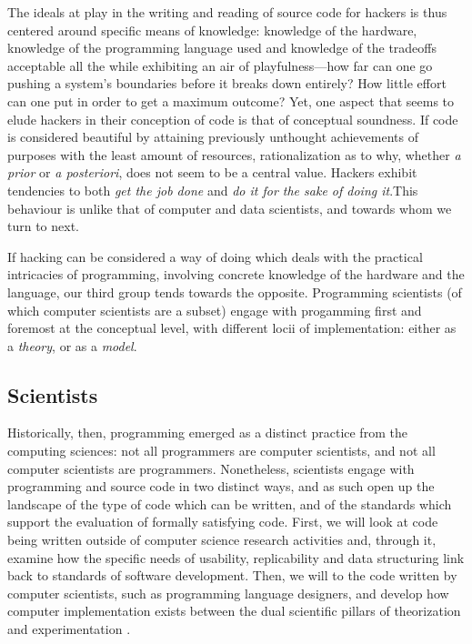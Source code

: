 The ideals at play in the writing and reading of source code for hackers is thus centered around specific means of knowledge: knowledge of the hardware, knowledge of the programming language used and knowledge of the tradeoffs acceptable all the while exhibiting an air of playfulness—how far can one go pushing a system's boundaries before it breaks down entirely? How little effort can one put in order to get a maximum outcome? Yet, one aspect that seems to elude hackers in their conception of code is that of conceptual soundness. If code is considered beautiful by attaining previously unthought achievements of purposes with the least amount of resources, rationalization as to why, whether \emph{a prior} or \emph{a posteriori}, does not seem to be a central value. Hackers exhibit tendencies to both \emph{get the job done} and \emph{do it for the sake of doing it}.This behaviour is unlike that of computer and data scientists, and towards whom we turn to next.

If hacking can be considered a way of doing which deals with the practical intricacies of programming, involving concrete knowledge of the hardware and the language, our third group tends towards the opposite. Programming scientists (of which computer scientists are a subset) engage with progamming first and foremost at the conceptual level, with different locii of implementation: either as a \emph{theory}, or as a \emph{model}.

\subsection{Scientists}
\label{subsec:scientists}

Historically, then, programming emerged as a distinct practice from the computing sciences: not all programmers are computer scientists, and not all computer scientists are programmers. Nonetheless, scientists engage with programming and source code in two distinct ways, and as such open up the landscape of the type of code which can be written, and of the standards which support the evaluation of formally satisfying code. First, we will look at code being written outside of computer science research activities and, through it, examine how the specific needs of usability, replicability and data structuring link back to standards of software development. Then, we will to the code written by computer scientists, such as programming language designers, and develop how computer implementation exists between the dual scientific pillars of theorization and experimentation \citep{vardi_science_2010}.

